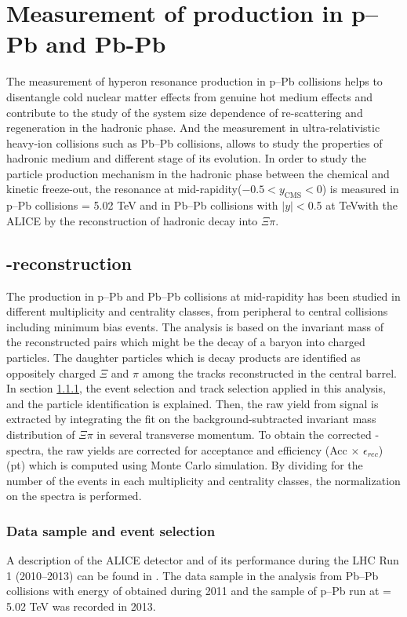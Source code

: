 \section{Measurement of \xis production in p--Pb and Pb-Pb}\label{sec:pPbPbPb}
The measurement of hyperon resonance production in p--Pb collisions helps to disentangle cold nuclear matter effects from genuine hot medium effects and contribute to the study of the system size dependence of re-scattering and regeneration in the hadronic phase. And the measurement in ultra-relativistic heavy-ion collisions such as Pb--Pb collisions, allows to study the properties of hadronic medium and different stage of its evolution. 
In order to study the particle production mechanism in the hadronic phase between the chemical and kinetic freeze-out, the \xis resonance at mid-rapidity($-0.5<y_{\mathrm{CMS}}<0$) is measured in p--Pb collisions \snn = 5.02  TeV and in Pb--Pb collisions with $|y|<$0.5 at  TeVwith the ALICE by the reconstruction of hadronic decay into $\Xi\pi$.

\subsection{\xis-reconstruction}\label{sec:Reconstruction}
The \xiss production in p--Pb and Pb--Pb collisions at mid-rapidity has been studied in different multiplicity and centrality classes, from peripheral to central collisions including minimum bias events. The analysis is based on the invariant mass of the reconstructed pairs which might be the decay of a \xiss baryon into charged particles. The daughter particles which is decay products are identified as oppositely charged $\Xi$ and $\pi$ among the tracks reconstructed in the central barrel. In section \ref{sec:Selection}, the event selection and track selection  applied in this analysis, and the particle identification is explained. Then, the raw yield from signal is extracted by integrating the fit on the background-subtracted invariant mass distribution of $\Xi$$\pi$ in several transverse momentum. To obtain the corrected \pt-spectra, the raw yields are corrected for acceptance and efficiency (Acc $\times$ $\epsilon_{rec}$)(pt) which is computed using Monte Carlo simulation. By dividing for the number of the events in each multiplicity and centrality classes, the normalization on the spectra is performed. 



\subsubsection{Data sample and event selection}\label{sec:Selection}
A description of the ALICE detector and of its performance during the LHC Run 1 (2010--2013)
can be found in \cite{cite:ALICE, cite:ALICEPerformance}. The data sample in the analysis from Pb--Pb collisions with energy of  obtained during 2011 and the sample of p--Pb run at \snn = 5.02 TeV was recorded in 2013. 

